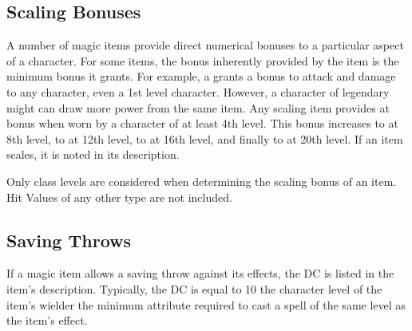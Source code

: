 \subsection{Scaling Bonuses}\label{Scaling Bonuses}
A number of magic items provide direct numerical bonuses to a particular aspect of a character. For some items, the bonus inherently provided by the item is the minimum bonus it grants. For example, a  grants a  bonus to attack and damage to any character, even a 1st level character. However, a character of legendary might can draw more power from the same item. Any scaling item provides at  bonus when worn by a character of at least 4th level. This bonus increases to  at 8th level, to  at 12th level, to  at 16th level, and finally to  at 20th level. If an item scales, it is noted in its description.

Only class levels are considered when determining the scaling bonus of an item. Hit Values of any other type are not included.

\subsection{Saving Throws}

If a magic item allows a saving throw against its effects, the DC is listed in the item's description. Typically, the DC is equal to 10 \add the character level of the item's wielder \add the minimum attribute required to cast a spell of the same level as the item's effect.

\begin{comment}
\subsection{Charges, Doses, and Multiple Uses}

Many items, particularly wands and staffs, are limited in power by the number of charges they hold. Normally, charged items have 50 charges at most. If such an item is found as a random part of a treasure, roll d\% and divide by 2 to determine the number of charges left (round down, minimum 1). If the item has a maximum number of charges other than 50, roll randomly to determine how many charges are left.

Prices listed are always for fully charged items. (When an item is created, it is fully charged.) An item with no charges left is worth half the price of a fully charged item. For an item that's worthless when its charges run out (which is the case for almost all charged items), the value of the partially used item is proportional to the number of charges left. For an item that has usefulness in addition to its charges, only part of the item's value is based on the number of charges left.
\end{comment}


